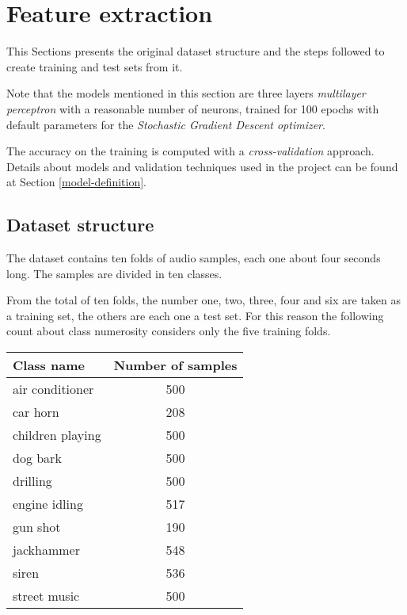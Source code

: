 \section{Feature extraction}
\label{feature-extraction}

This Sections presents the original dataset structure and the 
steps followed to create training and test sets from it.

Note that the models mentioned in this section are
three layers \emph{multilayer perceptron} with a reasonable number of neurons, trained 
for 100 epochs with default parameters for the \emph{Stochastic Gradient 
Descent optimizer}.~\cite{mlp}~\cite{sgd}

The accuracy on the training is computed with a \emph{cross-validation} 
approach.~\cite{cross}
Details about models and validation techniques used in 
the project can be found at Section \vref{model-definition}.

\subsection{Dataset structure}
\label{dataset-structure}

The dataset contains ten folds of audio samples, each one about 
four seconds long. The samples are divided in ten classes. 

From the total of ten folds, the number one, two, three, four and six 
are taken as a training set, the others are each one a test set.
For this reason the following count about class numerosity considers
only the five training folds.

\begin{center}
    \begin{tabular}{ |l|c| } 
        \hline
        Class name & Number of samples \\
        \hline
        air conditioner & 500 \\
        car horn & 208 \\
        children playing & 500 \\
        dog bark & 500 \\
        drilling & 500 \\
        engine idling & 517 \\
        gun shot & 190 \\
        jackhammer & 548 \\
        siren & 536 \\
        street music & 500 \\
        \hline
    \end{tabular}
\end{center}

